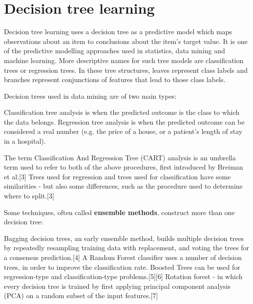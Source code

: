 \documentclass[caret-main.tex]{subfiles}
\begin{document}
\section{Decision tree learning}




Decision tree learning uses a decision tree as a predictive model which maps observations about an item to conclusions about the item's target value. It is one of the predictive modelling approaches used in statistics, data mining and machine learning. More descriptive names for such tree models are classification trees or regression trees. In these tree structures, leaves represent class labels 
and branches represent conjunctions of features that lead to those class labels.


Decision trees used in data mining are of two main types:

Classification tree analysis is when the predicted outcome is the class to which the data belongs.
Regression tree analysis is when the predicted outcome can be considered a real number (e.g. the price of a house, or a patient’s length of stay in a hospital).


The term Classification And Regression Tree (CART) analysis is an umbrella term used to refer to both of the above procedures, first introduced by Breiman et al.[3] Trees used for regression and trees used for classification have some similarities - but also some differences, such as the procedure used to determine where to split.[3]

Some techniques, often called \textbf{ensemble methods}, construct more than one decision tree:

Bagging decision trees, an early ensemble method, builds multiple decision trees by repeatedly resampling training data with replacement, and voting the trees for a consensus prediction.[4]
A Random Forest classifier uses a number of decision trees, in order to improve the classification rate.
Boosted Trees can be used for regression-type and classification-type problems.[5][6]
Rotation forest - in which every decision tree is trained by first applying principal component analysis (PCA) on a random subset of the input features.[7]

\end{document}
